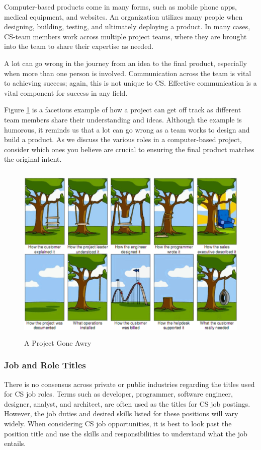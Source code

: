 Computer-based products come in many forms, such as mobile phone apps, medical equipment, and websites. An organization utilizes many people when designing, building, testing, and ultimately deploying a product. In many cases, CS-team members work across multiple project teams, where they are brought into the team to share their expertise as needed. 

A lot can go wrong in the journey from an idea to the final product, especially when more than one person is involved. Communication across the team is vital to achieving success; again, this is not unique to CS. Effective communication is a vital component for success in any field.

Figure \ref{fig:figure1} is a facetious example of how a project can get off track as different team members share their understanding and ideas. Although the example is humorous, it reminds us that a lot can go wrong as a team works to design and build a product. As we discuss the various roles in a computer-based project, consider which ones you believe are crucial to ensuring the final product matches the original intent.

\begin{figure}[H]
	\begin{center}
		\caption{A Project Gone Awry}
		\label{fig:figure1}
		\vskip 4pt
		\includegraphics[height=3.4in]{figs2/tree-swing-requirements-issue.png}
	\end{center}
\end{figure}

\vspace{10pt}

\subsubsection{Job and Role Titles}
There is no consensus across private or public industries regarding the titles used for CS job roles. Terms such as developer, programmer, software engineer, designer, analyst, and architect, are often used as the titles for CS job postings. However, the job duties and desired skills listed for these positions will vary widely. When considering CS job opportunities, it is best to look past the position title and use the skills and responsibilities to understand what the job entails.

